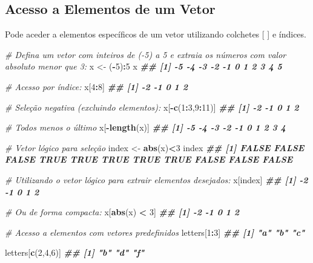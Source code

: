 \documentclass[
]{book}
\newenvironment{Shaded}{\begin{snugshade}}{\end{snugshade}}
\newcommand{\CommentTok}[1]{\textcolor[rgb]{0.56,0.35,0.01}{\textit{#1}}}
\newcommand{\DecValTok}[1]{\textcolor[rgb]{0.00,0.00,0.81}{#1}}
\newcommand{\DocumentationTok}[1]{\textcolor[rgb]{0.56,0.35,0.01}{\textbf{\textit{#1}}}}
\newcommand{\FunctionTok}[1]{\textcolor[rgb]{0.13,0.29,0.53}{\textbf{#1}}}
\newcommand{\NormalTok}[1]{#1}
\newcommand{\OtherTok}[1]{\textcolor[rgb]{0.56,0.35,0.01}{#1}}
\newcommand{\SpecialCharTok}[1]{\textcolor[rgb]{0.81,0.36,0.00}{\textbf{#1}}}
\begin{document}
\subsection{Acesso a Elementos de um Vetor}\label{acesso-a-elementos-de-um-vetor}

Pode aceder a elementos específicos de um vetor utilizando colchetes {[} {]}
e índices.

\begin{Shaded}
\begin{Highlighting}[]
\CommentTok{\# Defina um vetor com inteiros de ({-}5) a 5 e extraia os números com valor absoluto menor que 3:}
\NormalTok{x }\OtherTok{\textless{}{-}}\NormalTok{ (}\SpecialCharTok{{-}}\DecValTok{5}\NormalTok{)}\SpecialCharTok{:}\DecValTok{5}
\NormalTok{x}
\DocumentationTok{\#\#  [1] {-}5 {-}4 {-}3 {-}2 {-}1  0  1  2  3  4  5}

\CommentTok{\# Acesso por índice:}
\NormalTok{x[}\DecValTok{4}\SpecialCharTok{:}\DecValTok{8}\NormalTok{]}
\DocumentationTok{\#\# [1] {-}2 {-}1  0  1  2}
 
\CommentTok{\# Seleção negativa (excluindo elementos):}
\NormalTok{x[}\SpecialCharTok{{-}}\FunctionTok{c}\NormalTok{(}\DecValTok{1}\SpecialCharTok{:}\DecValTok{3}\NormalTok{,}\DecValTok{9}\SpecialCharTok{:}\DecValTok{11}\NormalTok{)]}
\DocumentationTok{\#\# [1] {-}2 {-}1  0  1  2}

\CommentTok{\# Todos menos o último}
\NormalTok{x[}\SpecialCharTok{{-}}\FunctionTok{length}\NormalTok{(x)]}
\DocumentationTok{\#\# [1] {-}5 {-}4 {-}3 {-}2 {-}1  0  1  2  3  4}

\CommentTok{\# Vetor lógico para seleção}
\NormalTok{index }\OtherTok{\textless{}{-}} \FunctionTok{abs}\NormalTok{(x)}\SpecialCharTok{\textless{}}\DecValTok{3}
\NormalTok{index }
\DocumentationTok{\#\#  [1] FALSE FALSE FALSE  TRUE  TRUE  TRUE  TRUE  TRUE FALSE FALSE FALSE}

\CommentTok{\# Utilizando o vetor lógico para extrair elementos desejados:}
\NormalTok{x[index]}
\DocumentationTok{\#\# [1] {-}2 {-}1  0  1  2}

\CommentTok{\# Ou de forma compacta:}
\NormalTok{x[}\FunctionTok{abs}\NormalTok{(x) }\SpecialCharTok{\textless{}} \DecValTok{3}\NormalTok{]}
\DocumentationTok{\#\# [1] {-}2 {-}1  0  1  2}

\CommentTok{\# Acesso a elementos com vetores predefinidos}
\NormalTok{letters[}\DecValTok{1}\SpecialCharTok{:}\DecValTok{3}\NormalTok{]}
\DocumentationTok{\#\# [1] "a" "b" "c"}

\NormalTok{letters[}\FunctionTok{c}\NormalTok{(}\DecValTok{2}\NormalTok{,}\DecValTok{4}\NormalTok{,}\DecValTok{6}\NormalTok{)]}
\DocumentationTok{\#\# [1] "b" "d" "f"}


\end{Highlighting}
\end{Shaded}
\end{document}
